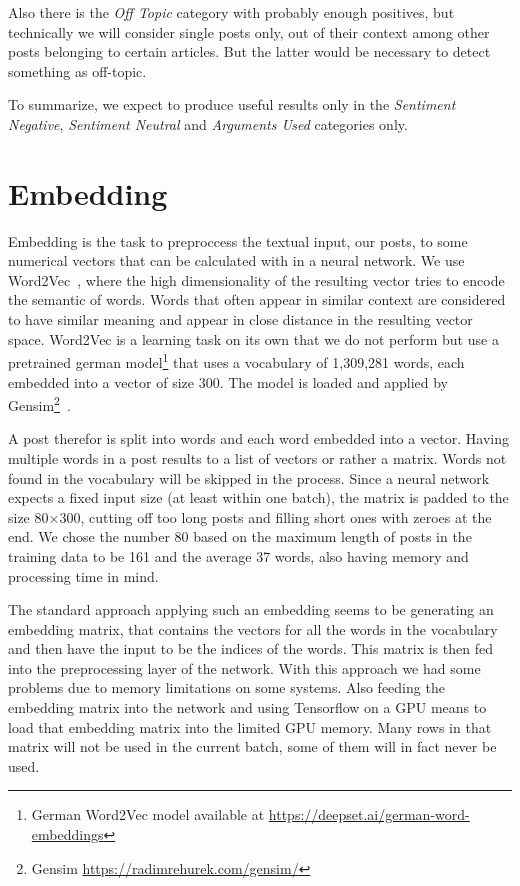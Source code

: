 \documentclass[11pt,a4paper]{article}
\begin{document}
Also there is the \textit{Off Topic} category with probably enough positives, but technically we will consider single posts only, out of their context among other posts belonging to certain articles. But the latter would be necessary to detect something as off-topic.

To summarize, we expect to produce useful results only in the \textit{Sentiment Negative}, \textit{Sentiment Neutral} and \textit{Arguments Used} categories only.

\section{Embedding}

Embedding is the task to preproccess the textual input, our posts, to some numerical vectors that can be calculated with in a neural network. 
We use Word2Vec~\cite{word2vec}, where the high dimensionality of the resulting vector tries to encode the semantic of words. 
Words that often appear in similar context are considered to have similar meaning and appear in close distance in the resulting vector space.
Word2Vec is a learning task on its own that we do not perform but use a pretrained german model\footnote{German Word2Vec model available at \url{https://deepset.ai/german-word-embeddings}} that uses a vocabulary of 1,309,281 words, each embedded into a vector of size 300.
The model is loaded and applied by Gensim\footnote{Gensim \url{https://radimrehurek.com/gensim/}}~\cite{gensim}.

A post therefor is split into words and each word embedded into a vector. Having multiple words in a post results to a list of vectors or rather a matrix. 
Words not found in the vocabulary will be skipped in the process. 
Since a neural network expects a fixed input size (at least within one batch), the matrix is padded to the size 80$\times$300, cutting off too long posts and filling short ones with zeroes at the end. 
We chose the number 80 based on the maximum length of posts in the training data to be 161 and the average 37 words, also having memory and processing time in mind.

The standard approach applying such an embedding seems to be generating an embedding matrix, that contains the vectors for all the words in the vocabulary and then have the input to be the indices of the words. 
This matrix is then fed into the preprocessing layer of the network. With this approach we had some problems due to memory limitations on some systems. 
Also feeding the embedding matrix into the network and using Tensorflow on a GPU means to load that embedding matrix into the limited GPU memory. 
Many rows in that matrix will not be used in the current batch, some of them will in fact never be used.
\end{document}
